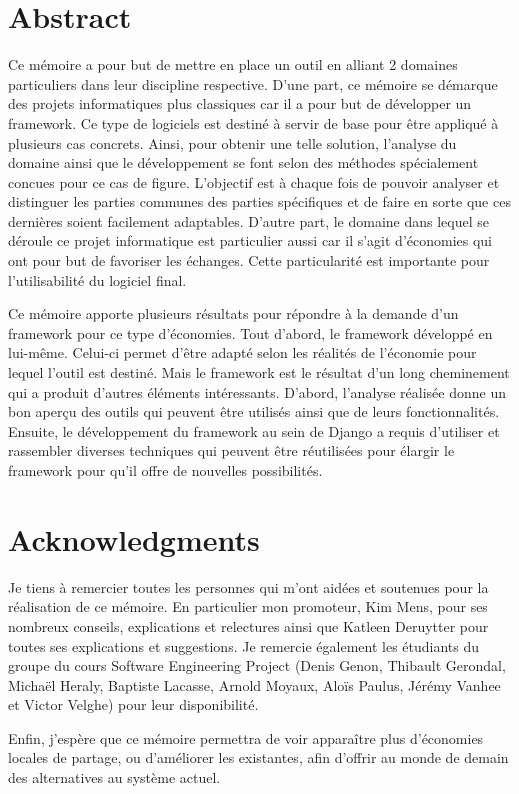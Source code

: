 \newpage
\thispagestyle{empty}
\mbox{}

\section*{Abstract}

Ce mémoire a pour but de mettre en place un outil en alliant 2 domaines particuliers dans leur discipline respective.  D'une part,  ce mémoire se démarque des projets informatiques plus classiques car il a pour but de développer un framework.  Ce type de logiciels est destiné à servir de base pour être appliqué à plusieurs cas concrets.   Ainsi,  pour obtenir une telle solution,  l'analyse du domaine ainsi que le développement se font selon des méthodes spécialement concues pour ce cas de figure.  L'objectif est à chaque fois de pouvoir analyser et distinguer les parties communes des parties spécifiques et de faire en sorte que ces dernières soient facilement adaptables.  D'autre part,  le domaine dans lequel se déroule ce projet informatique est particulier aussi car il s'agit d'économies qui ont pour but de favoriser les échanges.  Cette particularité est importante pour l'utilisabilité du logiciel final.

Ce mémoire apporte plusieurs résultats pour répondre à la demande d'un framework pour ce type d'économies.  Tout d'abord,  le framework développé en lui-même.  Celui-ci permet d'être adapté selon les réalités de l'économie pour lequel l'outil est destiné.  Mais le framework est le résultat d'un long cheminement qui a produit d'autres éléments intéressants.  D'abord,  l'analyse réalisée donne un bon aperçu des outils qui peuvent être utilisés ainsi que de leurs fonctionnalités.  Ensuite,  le développement du framework au sein de Django a requis d'utiliser et rassembler diverses techniques qui peuvent être réutilisées pour élargir le framework pour qu'il offre de nouvelles possibilités.

\newpage
\thispagestyle{empty}
\mbox{}

\section*{Acknowledgments}

Je tiens à remercier toutes les personnes qui m'ont aidées et soutenues pour la réalisation de ce mémoire.  En particulier mon promoteur,  Kim Mens,  pour ses nombreux conseils,  explications et relectures ainsi que Katleen Deruytter pour toutes ses explications et  suggestions.  Je remercie également les étudiants du groupe du cours Software Engineering Project (Denis Genon, Thibault Gerondal, Michaël Heraly, Baptiste Lacasse, Arnold Moyaux, Aloïs Paulus, Jérémy Vanhee et Victor Velghe) pour leur disponibilité.  

Enfin,  j'espère que ce mémoire permettra de voir apparaître plus d'économies locales de partage,  ou d'améliorer les existantes,  afin d'offrir au monde de demain des alternatives au système actuel.
\newpage
\thispagestyle{empty}
\mbox{}
